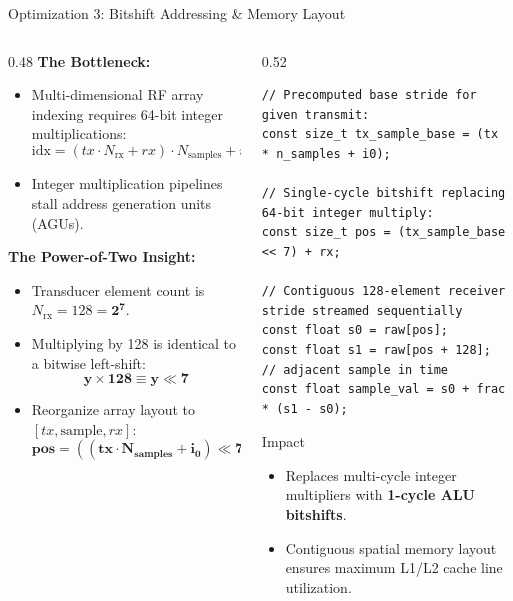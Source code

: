 \documentclass[aspectratio=169,10pt]{beamer}
\begin{document}
\begin{frame}[fragile]{Optimization 3: Bitshift Addressing \& Memory Layout}
  \begin{columns}[T]
    \begin{column}{0.48\textwidth}
      \textbf{\small The Bottleneck:}
      \scriptsize
      \begin{itemize}
        \item Multi-dimensional RF array indexing requires 64-bit integer multiplications:
        $$\text{idx} = (tx \cdot N_{\text{rx}} + rx) \cdot N_{\text{samples}} + i_0$$
        \item Integer multiplication pipelines stall address generation units (AGUs).
      \end{itemize}
      \textbf{\small The Power-of-Two Insight:}
      \scriptsize
      \begin{itemize}
        \item Transducer element count is $N_{\text{rx}} = 128 = \mathbf{2^7}$.
        \item Multiplying by 128 is identical to a bitwise left-shift:
        $$\mathbf{y \times 128 \equiv y \ll 7}$$
        \item Reorganize array layout to $[tx, \text{sample}, rx]$:
        $$\mathbf{\text{pos} = ((tx \cdot N_{\text{samples}} + i_0) \ll 7) + rx}$$
      \end{itemize}
    \end{column}
    \begin{column}{0.52\textwidth}
\begin{lstlisting}[caption={Power-of-Two Fast Linear Addressing}]
// Precomputed base stride for given transmit:
const size_t tx_sample_base = (tx * n_samples + i0);

// Single-cycle bitshift replacing 64-bit integer multiply:
const size_t pos = (tx_sample_base << 7) + rx;

// Contiguous 128-element receiver stride streamed sequentially
const float s0 = raw[pos];
const float s1 = raw[pos + 128]; // adjacent sample in time
const float sample_val = s0 + frac * (s1 - s0);
\end{lstlisting}
      \begin{block}{Impact}
        \scriptsize
        \begin{itemize}
          \item Replaces multi-cycle integer multipliers with \textbf{1-cycle ALU bitshifts}.
          \item Contiguous spatial memory layout ensures maximum L1/L2 cache line utilization.
        \end{itemize}
      \end{block}
    \end{column}
  \end{columns}
\end{frame}
\end{document}
